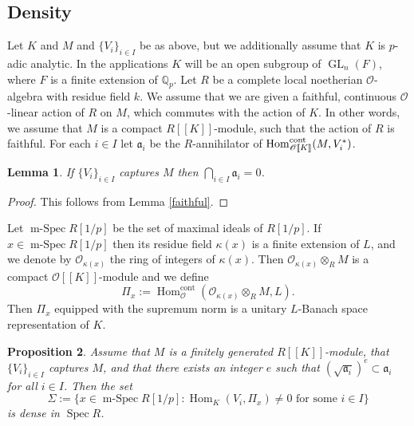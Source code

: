 \documentclass[JEP,XML,SOM,Unicode,NoEqCountersInSection]{cedram}
\let\mathcal\mathscr
\newtheorem{prop}{Proposition}[section]
\newtheorem{lem}[prop]{Lemma}
\theoremstyle{definition}
\DeclareMathOperator{\Hom}{Hom}
\DeclareMathOperator{\GL}{GL}
\DeclareMathOperator{\Spec}{Spec}
\DeclareMathOperator{\mSpec}{m-Spec}
\newcommand{\br}[1]{[\![#1]\!]}
\newcommand{\Qp}{\mathbb {Q}_p}
\newcommand{\cO}{\mathcal{O}}
\newcommand{\cont}{\mathrm{cont}}
\begin{document}
\subsection{Density}

Let $K$ and $M$ and $\{V_i\}_{i\in I}$ be as above, but we additionally assume that $K$ is $p$-adic analytic. In the applications $K$ will be an open subgroup of $\GL_n(F)$, where $F$ is a finite extension of $\Qp$.
Let $R$ be a complete local noetherian $\cO$-algebra with residue field $k$. We assume that we are given a faithful, continuous
$\cO$-linear action of $R$ on $M$, which commutes with the action of $K$. In other words, we assume that $M$ is a compact $R\br {K}$-module, such that the action of $R$ is faithful.
For each $i\in I$ let $\mathfrak a_i$ be the $R$-annihilator of $\Hom_{\cO\br{K}}^{\rm cont}(M, V_i^*)$.

\begin{lem}\label{caught_it} If $\{V_i\}_{i\in I}$ captures $M$ then $\bigcap_{i\in I} \mathfrak a_i= 0$.
\end{lem}

\begin{proof} This follows from Lemma \ref{faithful}.
\end{proof}

Let $\mSpec R[1/p]$ be the set of maximal ideals of $R[1/p]$. If $x\in \mSpec R[1/p]$ then its residue field $\kappa(x)$ is a finite extension of $L$, and we denote by $\cO_{\kappa(x)}$
the ring of integers of $\kappa(x)$. Then $\cO_{\kappa(x)}\otimes_R M$ is a compact $\cO\br{K}$-module and
we define\vspace*{-3pt}
\[
\Pi_x:=\Hom^{\cont}_{\cO}(\cO_{\kappa(x)}\otimes_R M, L).
\]
Then $\Pi_x$ equipped with the supremum norm is a unitary $L$-Banach space representation of $K$.

\begin{prop}\label{dense_cap} Assume that $M$ is a finitely generated $R\br{K}$-module,
that $\{V_i\}_{i \in I}$ captures $M$,
and that there exists an integer $e$ such that $(\sqrt{\mathfrak a_i})^e \subset \mathfrak a_i$ for all $i\in I$. Then the set\vspace*{-3pt}
\[
\Sigma:=\{ x\in \mSpec R[1/p]: \Hom_K(V_i, \Pi_x)\neq 0 \text{ for some } i\in I\}
\]
is dense in $\Spec R$.
\end{prop}
\end{document}
